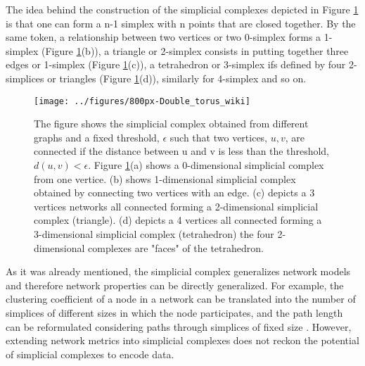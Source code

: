\documentclass[onecollarge,runningheads]{svjour2}
\begin{document}
The idea behind the construction of the simplicial complexes depicted in Figure \ref{fig:vrcomplex} is that one can form a n-1 simplex with n points that are closed together. By the same token, a relationship between two vertices or two 0-simplex forms a 1-simplex (Figure \ref{fig:vrcomplex}(b)), a triangle or 2-simplex consists in putting together three edges or 1-simplex (Figure \ref{fig:vrcomplex}(c)), a tetrahedron or 3-simplex ifs defined by four 2-simplices or triangles (Figure \ref{fig:vrcomplex}(d)), similarly for 4-simplex and so on.

\begin{figure}[h]
        \centering
        \texttt{[image: ../figures/800px-Double\_torus\_wiki]}
        \caption{The figure shows the simplicial complex obtained from different graphs and a fixed threshold, $\epsilon$ such that two vertices, $u, v$, are connected if the distance between u and v is less than the threshold, $d(u,v) < \epsilon$. Figure \ref{fig:vrcomplex}(a) shows a 0-dimensional simplicial complex from one vertice. (b) shows 1-dimensional simplicial complex obtained by connecting two vertices with an edge.  (c) depicts a 3 vertices networks all connected forming a 2-dimensional simplicial complex (triangle). (d) depicts a 4 vertices all connected forming a 3-dimensional simplicial complex (tetrahedron) the four 2-dimensional complexes are "faces" of the tetrahedron.}
\label{fig:vrcomplex}
\end{figure}

As it was already mentioned, the simplicial complex generalizes network models and therefore network properties can be directly generalized. For example, the clustering coefficient of a node in a network can be translated into the number of simplices of different sizes in which the node participates, and the path length can be reformulated considering paths through simplices of fixed size \cite{dotko2016topological}. However, extending network metrics into simplicial complexes does not reckon the potential of simplicial complexes to encode data.
\end{document}
